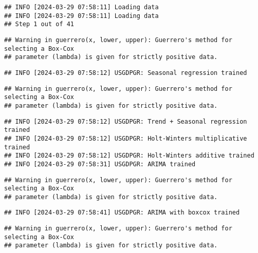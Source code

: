 \documentclass[
]{article}
\begin{document}
\begin{verbatim}
## INFO [2024-03-29 07:58:11] Loading data
## INFO [2024-03-29 07:58:11] Loading data
## Step 1 out of 41
\end{verbatim}

\begin{verbatim}
## Warning in guerrero(x, lower, upper): Guerrero's method for selecting a Box-Cox
## parameter (lambda) is given for strictly positive data.
\end{verbatim}

\begin{verbatim}
## INFO [2024-03-29 07:58:12] USGDPGR: Seasonal regression trained
\end{verbatim}

\begin{verbatim}
## Warning in guerrero(x, lower, upper): Guerrero's method for selecting a Box-Cox
## parameter (lambda) is given for strictly positive data.
\end{verbatim}

\begin{verbatim}
## INFO [2024-03-29 07:58:12] USGDPGR: Trend + Seasonal regression trained
## INFO [2024-03-29 07:58:12] USGDPGR: Holt-Winters multiplicative trained
## INFO [2024-03-29 07:58:12] USGDPGR: Holt-Winters additive trained
## INFO [2024-03-29 07:58:31] USGDPGR: ARIMA trained
\end{verbatim}

\begin{verbatim}
## Warning in guerrero(x, lower, upper): Guerrero's method for selecting a Box-Cox
## parameter (lambda) is given for strictly positive data.
\end{verbatim}

\begin{verbatim}
## INFO [2024-03-29 07:58:41] USGDPGR: ARIMA with boxcox trained
\end{verbatim}

\begin{verbatim}
## Warning in guerrero(x, lower, upper): Guerrero's method for selecting a Box-Cox
## parameter (lambda) is given for strictly positive data.
\end{verbatim}
\end{document}
